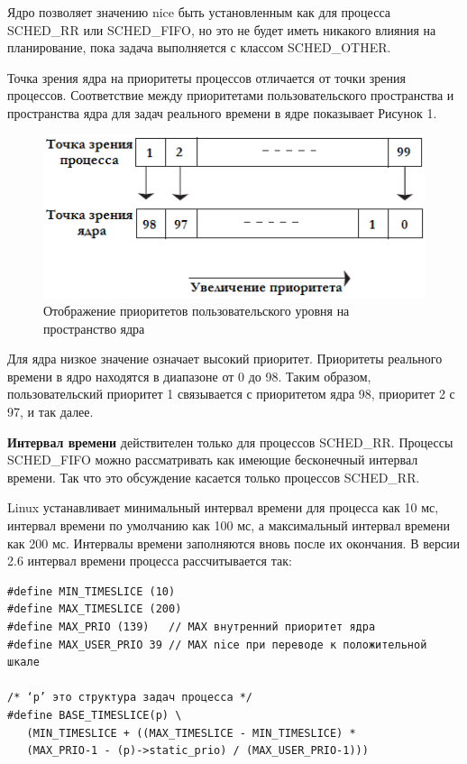 Ядро позволяет значению nice быть установленным как для процесса SCHED\_RR или SCHED\_FIFO, но это не будет иметь никакого влияния на планирование, пока задача выполняется с классом SCHED\_OTHER.

Точка зрения ядра на приоритеты процессов отличается от точки зрения процессов. Соответствие между приоритетами пользовательского пространства и пространства ядра для задач реального времени в ядре показывает Рисунок 1.

\begin{figure}[h!]
\centering
\includegraphics[scale=1]{res/pic001}
\caption{Отображение приоритетов пользовательского уровня на пространство ядра}
\end{figure}

Для ядра низкое значение означает высокий приоритет. Приоритеты реального времени в ядро находятся в диапазоне от 0 до 98. Таким образом, пользовательский приоритет 1 связывается с приоритетом ядра 98, приоритет 2 с 97, и так далее.

\textbf{Интервал времени} действителен только для процессов SCHED\_RR. Процессы SCHED\_FIFO можно рассматривать как имеющие бесконечный интервал времени. Так что это обсуждение касается только процессов SCHED\_RR.

Linux устанавливает минимальный интервал времени для процесса как 10 мс, интервал времени по умолчанию как 100 мс, а максимальный интервал времени как 200 мс. Интервалы времени заполняются вновь после их окончания\cite{Raghavan}. В версии 2.6 интервал времени процесса рассчитывается так:

\begin{Verbatim}[frame=single]
#define MIN_TIMESLICE (10)
#define MAX_TIMESLICE (200)
#define MAX_PRIO (139)   // MAX внутренний приоритет ядра
#define MAX_USER_PRIO 39 // MAX nice при переводе к положительной шкале

/* ‘p’ это структура задач процесса */
#define BASE_TIMESLICE(p) \
   (MIN_TIMESLICE + ((MAX_TIMESLICE - MIN_TIMESLICE) *
   (MAX_PRIO-1 - (p)->static_prio) / (MAX_USER_PRIO-1)))
\end{Verbatim}

